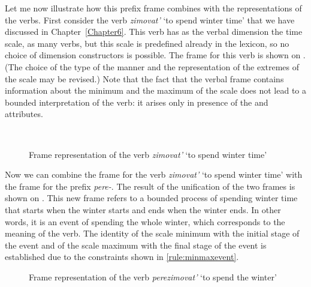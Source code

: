Let me now illustrate how this prefix frame combines with the representations of the verbs. First consider the verb \textit{zimovat'} `to spend winter time' that we have discussed in Chapter~\ref{Chapter6}. This verb has as the verbal dimension the time scale, as many verbs, but this scale is predefined already in the lexicon, so no choice of dimension constructors is possible. The frame for this verb is shown on . (The choice of the type of the manner and the representation of the extremes of the scale may be revised.) Note that the fact that the verbal frame contains information about the minimum and the maximum of the scale does not lead to a bounded interpretation of the verb: it arises only in presence of the \INIT and \FIN attributes.

\begin{figure}
\centering
{}\\
\hfill
\caption{Frame representation of the verb \textit{zimovat'} `to spend winter time' \label{frame:zimovat}}
\end{figure}

Now we can combine the frame for the verb \textit{zimovat'} `to spend winter time' with the frame for the prefix \textit{pere-}. The result of the unification of the two frames is shown on . This new frame refers to a bounded process of spending winter time that starts when the winter starts and ends when the winter ends. In other words, it is an event of spending the whole winter, which corresponds to the meaning of the verb. The identity of the scale minimum with the initial stage of the event and of the scale maximum with the final stage of the event is established due to the constraints shown in \ref{rule:minmaxevent}.

\begin{figure}
\centering
{}
\caption{Frame representation of the verb \textit{perezimovat'} `to spend the winter' \label{frame:perezimovat}}
\end{figure}

